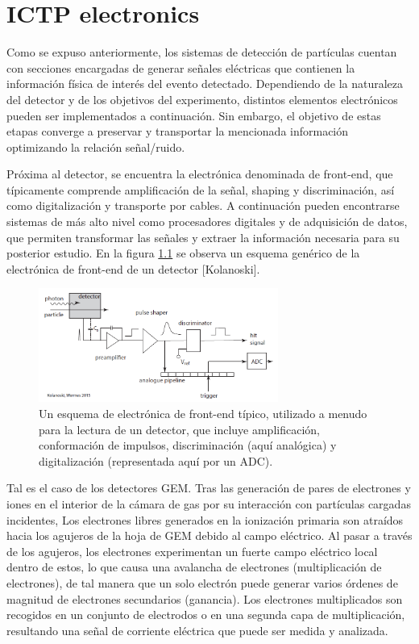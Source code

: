 \documentclass[]{book}
\begin{document}
\chapter{ICTP electronics}

\noindent Como se expuso anteriormente, los sistemas de detección de partículas cuentan con secciones encargadas de generar señales eléctricas que contienen la información física de interés del evento detectado. Dependiendo de la naturaleza del detector y de los objetivos del experimento, distintos elementos electrónicos pueden ser implementados a continuación. Sin embargo, el objetivo de estas etapas converge a preservar y transportar la mencionada información optimizando la relación señal/ruido. 
\newline

\noindent Próxima al detector, se encuentra la electrónica denominada de front-end, que típicamente comprende amplificación de la señal, shaping y discriminación, así como digitalización y transporte por cables. A continuación pueden encontrarse sistemas de más alto nivel como procesadores digitales y de adquisición de datos, que permiten transformar las señales y extraer la información necesaria para su posterior estudio. En la figura \ref{fig:generic_frontend} se observa un esquema genérico de la electrónica de front-end de un detector [Kolanoski].

\begin{figure}[h]
    \centering
    \includegraphics[width=0.7\textwidth]{typical_readout_electronics.PNG}
    \caption{Un esquema de electrónica de front-end típico, utilizado a menudo para la lectura de un
    detector, que incluye amplificación, conformación de impulsos, discriminación
    (aquí analógica) y digitalización (representada aquí por un ADC).}
    \label{fig:generic_frontend}

\end{figure}
    
\noindent Tal es el caso de los detectores GEM. Tras las generación de pares de electrones y iones en el interior de la cámara de gas por su interacción con partículas cargadas incidentes, Los electrones libres generados en la ionización primaria son atraídos hacia los agujeros de la hoja de GEM debido al campo eléctrico. Al pasar a través de los agujeros, los electrones experimentan un fuerte campo eléctrico local dentro de estos, lo que causa una avalancha de electrones (multiplicación de electrones), de tal manera que un solo electrón puede generar varios órdenes de magnitud de electrones secundarios (ganancia). Los electrones multiplicados son recogidos en un conjunto de electrodos o en una segunda capa de multiplicación, resultando una señal de corriente eléctrica que puede ser medida y analizada.
\end{document}
